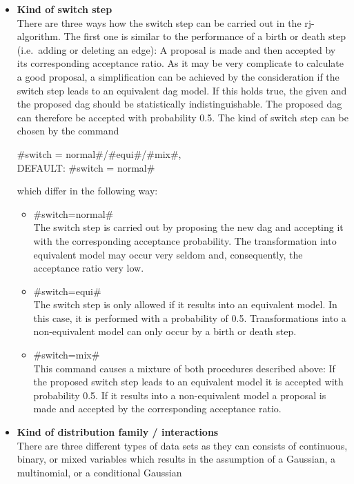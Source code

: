 \begin{itemize}
\item {\bf\sffamily Kind of switch step} \label{switch_step} \\
There are three ways how the switch step can be carried out in the
rj-algorithm. The first one is similar to the performance of a
birth or death step (i.e.~adding or deleting an edge): A proposal
is made and then accepted by its corresponding acceptance ratio.
As it may be very complicate to calculate a good proposal, a
simplification can be achieved by the consideration if the switch
step leads to an equivalent dag model. If this holds true, the
given and the proposed dag should be statistically
indistinguishable. The proposed dag can therefore be accepted with
probability 0.5. The kind of switch step can be chosen by the
command
\begin{center}
    #switch = normal#/#equi#/#mix#, \\
    \hspace*{-1.8cm}  DEFAULT: #switch = normal#
\end{center}
which differ in the following way:
\begin{itemize}
\item #switch=normal#\\
The switch step is carried out by proposing the new dag and
accepting it with the corresponding acceptance probability. The
transformation into equivalent model may occur very seldom and,
consequently, the acceptance ratio very low.
\item #switch=equi# \\
The switch step is only allowed if it results into an equivalent
model. In this case, it is performed with a probability of 0.5.
Transformations into a non-equivalent model can only occur by a
birth or death step.
\item #switch=mix#\\
This command causes a mixture of both procedures described above:
If the proposed switch step leads to an equivalent model it is
accepted with probability 0.5. If it results into a non-equivalent
model a proposal is made and accepted by the corresponding
acceptance ratio.
\end{itemize}
\item {\bf\sffamily Kind of distribution family / interactions }\\
There are three different types of data sets as they can consists
of continuous, binary, or mixed variables which results in the
assumption of a Gaussian, a multinomial, or a conditional Gaussian

\end{itemize}
